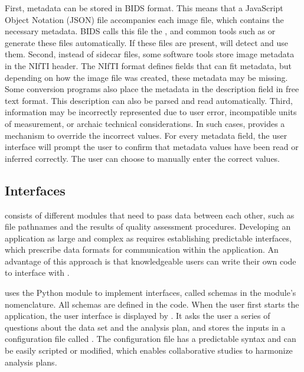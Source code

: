 First, metadata can be stored in BIDS format. This means that a JavaScript
Object Notation (JSON) file accompanies each image file, which contains the
necessary metadata. BIDS calls this file the , and common
tools such as  \citep{yaroslav_halchenko_2018_1306159} or
 \citep{10.1016/j.jneumeth.2016.03.001} generate these files
automatically. If these files are present,  will detect and
use them. Second, instead of sidecar files, some software tools store image
metadata in the NIfTI header. The NIfTI format defines fields that can fit
metadata, but depending on how the image file was created, these metadata
may be missing. Some conversion programs also place the metadata in the
description field in free text format. This description can also be parsed
and read automatically. Third, information may be incorrectly represented
due to user error, incompatible units of measurement, or archaic technical
considerations. In such cases,  provides a mechanism to
override the incorrect values. For every metadata field, the user interface
will prompt the user to confirm that metadata values have been read or
inferred correctly. The user can choose to manually enter the correct
values.

\subsection{Interfaces}

 consists of different modules that need to pass data
between each other, such as file pathnames and the results of quality
assessment procedures. Developing an application as large and complex as
 requires establishing predictable interfaces, which
prescribe data formats for communication within the application. An
advantage of this approach is that knowledgeable users can write their own
code to interface with .

 uses the Python module  to implement
interfaces, called schemas in the module's nomenclature. All schemas are
defined in the  code. When the user first starts the
application, the user interface is displayed by . It asks
the user a series of questions about the data set and the analysis plan,
and stores the inputs in a configuration file called . The
configuration file has a predictable syntax and can be easily scripted or
modified, which enables collaborative studies to harmonize analysis plans.
